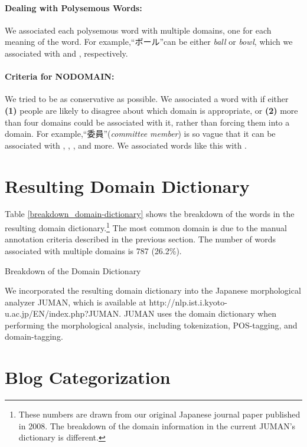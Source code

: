 \documentclass[english]{jnlp_1.4_rep}
\newcommand{\dom}[1]{}
\begin{document}
\paragraph{Dealing with Polysemous Words: }
We associated each polysemous word with multiple domains, 
one for each meaning of the word. 
For example,“ボール”can be either
\textit{ball} or \textit{bowl}, which we associated with
\dom{sports} and \dom{diet}, respectively.

\paragraph{Criteria for NODOMAIN: }
We tried to be as conservative as possible.
We associated a word with \dom{nodomain}
if either 
\textbf{(1)} people are likely to disagree about which domain is
appropriate, or
\textbf{(2)} more than four domains could be
associated with it, rather than forcing them into a domain.
For example,“委員”(\textit{committee member}) is so vague that it can be
associated with \dom{government}, \dom{business}, \dom{education}, and more.
We associated words like this with \dom{nodomain}.


\section{Resulting Domain Dictionary \label{sec:resulting-domain-dictionary}}

Table \ref{breakdown_domain-dictionary} shows the breakdown of the
 words in the resulting domain dictionary.\footnote{
These numbers are drawn from our original Japanese journal paper
 published in 2008.
The breakdown of the domain information in the current
 JUMAN's dictionary is different.}
The most common domain is \dom{nodomain} due to the manual annotation
criteria described in the previous section.
The number of words associated with multiple domains is 787
(26.2\%). 

\begin{table}[b]
\caption{Breakdown of the Domain Dictionary}
\label{breakdown_domain-dictionary}

\end{table}

We incorporated the resulting domain dictionary into the Japanese
morphological analyzer JUMAN, which is available at
http://nlp.ist.i.kyoto-u.ac.jp/EN/index.php?JUMAN.
JUMAN uses the domain dictionary when performing the morphological
analysis, including tokenization, POS-tagging, and domain-tagging.


\section{Blog Categorization}
\label{sec:blog-categorization}
\end{document}
